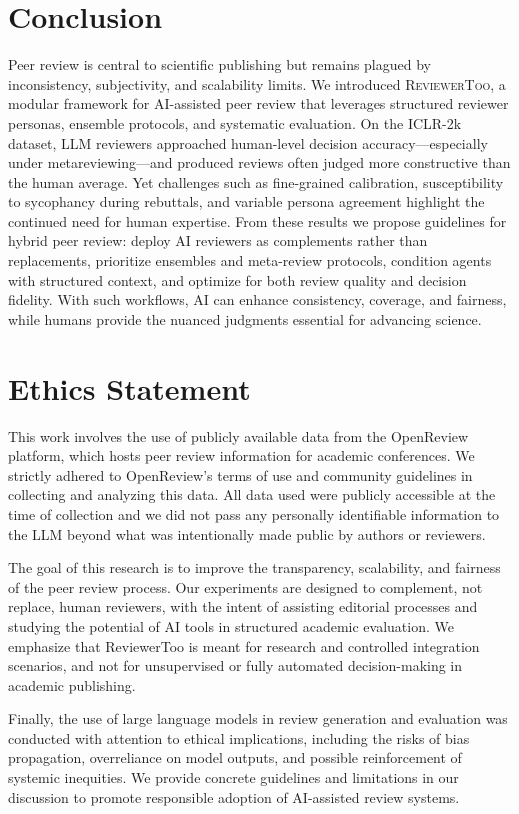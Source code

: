 \documentclass{article} %
\begin{document}
\section{Conclusion}
Peer review is central to scientific publishing but remains plagued by inconsistency, subjectivity, and scalability limits. We introduced \textsc{ReviewerToo}, a modular framework for AI-assisted peer review that leverages structured reviewer personas, ensemble protocols, and systematic evaluation. On the ICLR-2k dataset, LLM reviewers approached human-level decision accuracy—especially under metareviewing—and produced reviews often judged more constructive than the human average. Yet challenges such as fine-grained calibration, susceptibility to sycophancy during rebuttals, and variable persona agreement highlight the continued need for human expertise. From these results we propose guidelines for hybrid peer review: deploy AI reviewers as complements rather than replacements, prioritize ensembles and meta-review protocols, condition agents with structured context, and optimize for both review quality and decision fidelity. With such workflows, AI can enhance consistency, coverage, and fairness, while humans provide the nuanced judgments essential for advancing science.

\section{Ethics Statement}
This work involves the use of publicly available data from the OpenReview
 platform, which hosts peer review information for academic conferences. We strictly adhered to OpenReview’s terms of use and community guidelines in collecting and analyzing this data. All data used were publicly accessible at the time of collection and we did not pass any personally identifiable information to the LLM beyond what was intentionally made public by authors or reviewers.

The goal of this research is to improve the transparency, scalability, and fairness of the peer review process. Our experiments are designed to complement, not replace, human reviewers, with the intent of assisting editorial processes and studying the potential of AI tools in structured academic evaluation. We emphasize that ReviewerToo is meant for research and controlled integration scenarios, and not for unsupervised or fully automated decision-making in academic publishing.

Finally, the use of large language models in review generation and evaluation was conducted with attention to ethical implications, including the risks of bias propagation, overreliance on model outputs, and possible reinforcement of systemic inequities. We provide concrete guidelines and limitations in our discussion to promote responsible adoption of AI-assisted review systems.
\end{document}
